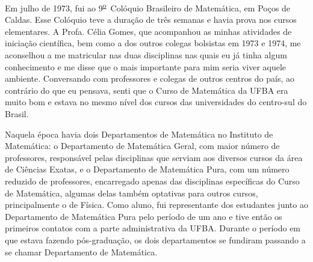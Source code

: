 \documentclass{hipatia}
\newcommand{\superou}{\textsuperscript{\underline{o}}~}
\begin{document}

Em julho de 1973, fui ao 9\superou  Colóquio Brasileiro de
Matemática, em Poços de Caldas. Esse Colóquio teve a duração
de três semanas e havia prova nos cursos elementares. A
Profa. Célia Gomes, que acompanhou as minhas atividades de
iniciação científica, bem como a dos outros colegas %
bolsistas %
em 1973 e 1974, me aconselhou a me %
matricular 
nas duas disciplinas nas quais eu já tinha algum
conhecimento e me disse que o mais importante para mim seria
viver aquele ambiente. Conversando com professores e colegas
de outros centros do país, ao contrário do que eu pensava,
senti que o Curso de Matemática da UFBA era muito bom e
estava no mesmo nível dos cursos das universidades do
centro-sul do Brasil.

Naquela época havia dois Departamentos de Matemática no
Instituto de Matemática: o Departamento de Matemática Geral,
com maior número de professores, responsável pelas
disciplinas que serviam aos diversos cursos da área de
Ciências Exatas, e o Departamento de Matemática Pura, com um
número reduzido de professores, encarregado apenas das
disciplinas específicas do Curso de Matemática, algumas
delas também optativas para outros cursos, principalmente o
de Física. Como aluno, fui representante dos estudantes
junto ao Departamento de Matemática Pura pelo período de um
ano e tive então os primeiros contatos com a parte
administrativa da UFBA. Durante o período em que estava
fazendo pós-graduação, os dois departamentos se fundiram
passando a se chamar Departamento de Matemática.
\end{document}
